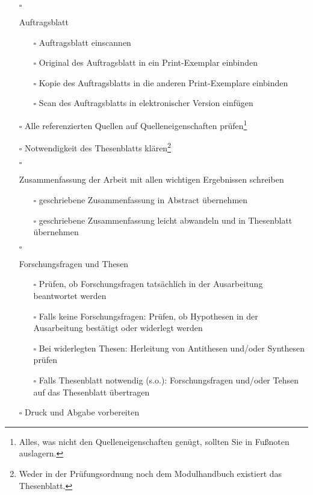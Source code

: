\begin{itemize}
{    }
    \item[$\square$]{
        Auftragsblatt
        \begin{itemize}
            \item[$\square$] Auftragsblatt einscannen
            \item[$\square$] Original des Auftragsblatt in ein Print-Exemplar einbinden
            \item[$\square$] Kopie des Auftragsblatts in die anderen Print-Exemplare einbinden
            \item[$\square$] Scan des Auftragsblatts in elektronischer Version einfügen
        \end{itemize}
    }
    \item[$\square$] Alle referenzierten Quellen auf Quelleneigenschaften prüfen\footnote{Alles, was nicht den Quelleneigenschaften genügt, sollten Sie in Fußnoten auslagern.}
    \item[$\square$] Notwendigkeit des Thesenblatts klären\footnote{Weder in der Prüfungsordnung noch dem Modulhandbuch existiert das Thesenblatt.}
    \item[$\square$]{
        Zusammenfassung der Arbeit mit allen wichtigen Ergebnissen schreiben
        \begin{itemize}
            \item[$\square$] geschriebene Zusammenfassung in Abstract übernehmen
            \item[$\square$] geschriebene Zusammenfassung leicht abwandeln und in Thesenblatt übernehmen
        \end{itemize}
    }
    \item[$\square$]{
        Forschungsfragen und Thesen
        \begin{itemize}
            \item[$\square$] Prüfen, ob Forschungsfragen tatsächlich in der Ausarbeitung beantwortet werden
            \item[$\square$] Falls keine Forschungsfragen: Prüfen, ob Hypothesen in der Ausarbeitung bestätigt oder widerlegt werden
            \item[$\square$] Bei widerlegten Thesen: Herleitung von Antithesen und/oder Synthesen prüfen
            \item[$\square$] Falls Thesenblatt notwendig (s.o.):  Forschungsfragen und/oder Tehsen auf das Thesenblatt übertragen
        \end{itemize}
    }
    \clearpage
    \item[$\square$]{
        Druck und Abgabe vorbereiten
}
\end{itemize}
